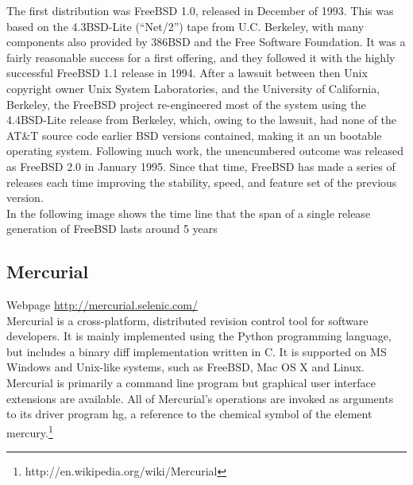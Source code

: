 \documentclass[11pt]{article} %
\begin{document}
The first distribution was FreeBSD 1.0, released in December of 1993. This was based on the 4.3BSD-Lite (“Net/2”) tape from U.C. Berkeley, with many components also provided by 386BSD and the Free Software Foundation. It was a fairly reasonable success for a first offering, and they followed it with the highly successful FreeBSD 1.1 release in  1994.
 After a lawsuit between then Unix copyright owner Unix System Laboratories, and the University of California, Berkeley, the FreeBSD project re-engineered most of the system using the 4.4BSD-Lite release from Berkeley, which, owing to the lawsuit, had none of the AT\&T source code earlier BSD versions contained, making it an un bootable operating system. Following much work, the unencumbered outcome was released as FreeBSD 2.0 in January 1995.
Since that time, FreeBSD has made a series of releases each time improving the stability, speed, and feature set of the previous version.\\
In the following image shows the time line that the span of a single release generation of FreeBSD lasts around 5 years
\pagebreak


\subsection{Mercurial}
Webpage \url{http://mercurial.selenic.com/}\\
Mercurial is a cross-platform, distributed revision control tool for software developers. It is mainly implemented using the Python programming language, but includes a binary diff implementation written in C. It is supported on MS Windows and Unix-like systems, such as FreeBSD, Mac OS X and Linux. Mercurial is primarily a command line program but graphical user interface extensions are available. All of Mercurial's operations are invoked as arguments to its driver program hg, a reference to the chemical symbol of the element mercury.\footnote{http://en.wikipedia.org/wiki/Mercurial}
\end{document}
